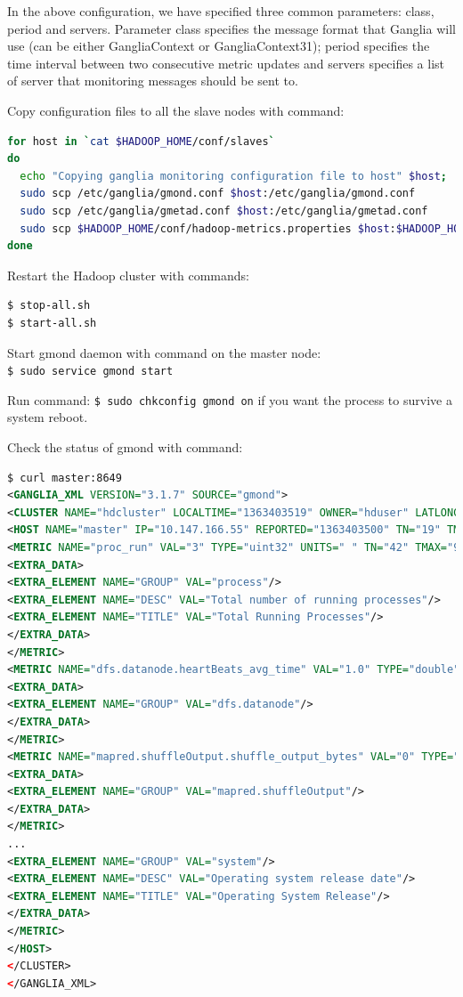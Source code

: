 In the above configuration, we have specified three common parameters: class, period and servers. Parameter class specifies the message format that Ganglia will use (can be either GangliaContext or GangliaContext31); period specifies the time interval between two consecutive metric updates and servers specifies a list of server that monitoring messages should be sent to.

Copy configuration files to all the slave nodes with command: 
\lstset{style=bashstyle}
\begin{lstlisting}[language=bash]
for host in `cat $HADOOP_HOME/conf/slaves`
do
  echo "Copying ganglia monitoring configuration file to host" $host;
  sudo scp /etc/ganglia/gmond.conf $host:/etc/ganglia/gmond.conf
  sudo scp /etc/ganglia/gmetad.conf $host:/etc/ganglia/gmetad.conf
  sudo scp $HADOOP_HOME/conf/hadoop-metrics.properties $host:$HADOOP_HOME/conf/hadoop-metrics.properties;
done
\end{lstlisting}

Restart the Hadoop cluster with commands:
\lstset{style=bashstyle}
\begin{lstlisting}[language=bash]
$ stop-all.sh
$ start-all.sh
\end{lstlisting}

Start gmond daemon with command on the master node: \\
\verb|$ sudo service gmond start|

Run command: \verb|$ sudo chkconfig gmond on| if you want the process to survive a system reboot.

Check the status of gmond with command: 
\lstset{style=bashstyle}
\begin{lstlisting}[language=XML]
$ curl master:8649
<GANGLIA_XML VERSION="3.1.7" SOURCE="gmond">
<CLUSTER NAME="hdcluster" LOCALTIME="1363403519" OWNER="hduser" LATLONG="unspecified" URL="hdcluster.com">
<HOST NAME="master" IP="10.147.166.55" REPORTED="1363403500" TN="19" TMAX="20" DMAX="0" LOCATION="unspecified" GMOND_STARTED="1363403380">
<METRIC NAME="proc_run" VAL="3" TYPE="uint32" UNITS=" " TN="42" TMAX="950" DMAX="0" SLOPE="both">
<EXTRA_DATA>
<EXTRA_ELEMENT NAME="GROUP" VAL="process"/>
<EXTRA_ELEMENT NAME="DESC" VAL="Total number of running processes"/>
<EXTRA_ELEMENT NAME="TITLE" VAL="Total Running Processes"/>
</EXTRA_DATA>
</METRIC>
<METRIC NAME="dfs.datanode.heartBeats_avg_time" VAL="1.0" TYPE="double" UNITS="" TN="2" TMAX="60" DMAX="0" SLOPE="both">
<EXTRA_DATA>
<EXTRA_ELEMENT NAME="GROUP" VAL="dfs.datanode"/>
</EXTRA_DATA>
</METRIC>
<METRIC NAME="mapred.shuffleOutput.shuffle_output_bytes" VAL="0" TYPE="float" UNITS="" TN="1225" TMAX="60" DMAX="0" SLOPE="positive">
<EXTRA_DATA>
<EXTRA_ELEMENT NAME="GROUP" VAL="mapred.shuffleOutput"/>
</EXTRA_DATA>
</METRIC>
...
<EXTRA_ELEMENT NAME="GROUP" VAL="system"/>
<EXTRA_ELEMENT NAME="DESC" VAL="Operating system release date"/>
<EXTRA_ELEMENT NAME="TITLE" VAL="Operating System Release"/>
</EXTRA_DATA>
</METRIC>
</HOST>
</CLUSTER>
</GANGLIA_XML>
\end{lstlisting}

